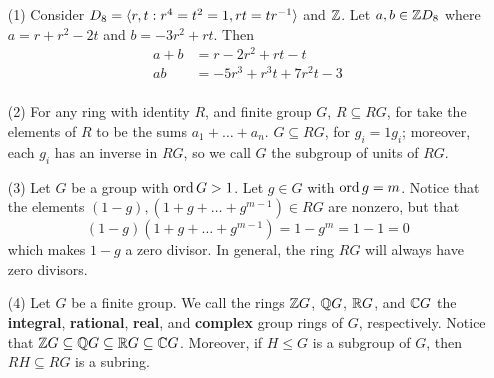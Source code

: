 \begin{example}\label{example_5.8}
    \begin{enumerate}
        \item[(1)] Consider $D_8=\langle r,t : r^4=t^2=1, rt=tr^{-1} \rangle$
            and $\mathbb{Z}$. Let $a,b \in \mathbb{Z}{D_8}$ where $a=r+r^2-2t$ and  $b=-3r^2+rt$.
            Then
            \begin{align*}
                a+b &=  r-2r^2+rt-t \\
                ab  &=  -5r^3+r^3t+7r^2t-3  \\
            \end{align*}

        \item[(2)] For any ring with identity $R$, and finite group $G$, $R
            \subseteq RG$, for take the elements of  $R$ to be the sums
            $a_1+\dots+a_n$. $G \subseteq RG$, for  $g_i=1g_i$; moreover, each
            $g_i$ has an inverse in  $RG$, so we call  $G$ the subgroup of units
            of $RG$.

        \item[(3)] Let $G$ be a group with $\operatorname{ord}{G}>1$. Let $g \in G$ with
            $\operatorname{ord}{g}=m$. Notice that the elements $(1-g),(1+g+\dots+g^{m-1}) \in
            RG$ are nonzero, but that
            \begin{equation*}
                (1-g)(1+g+\dots+g^{m-1})=1-g^m=1-1=0
            \end{equation*}
            which makes $1-g$ a zero divisor. In general, the ring $RG$ will
            always have zero divisors.

        \item[(4)] Let $G$ be a finite group. We call the rings  $\mathbb{Z}{G}$,
            $\mathbb{Q}{G}$, $\mathbb{R}{G}$, and $\mathbb{C}{G}$ the \textbf{integral},
            \textbf{rational}, \textbf{real}, and \textbf{complex} group rings
            of $G$, respectively. Notice that $\mathbb{Z}{G} \subseteq \mathbb{Q}{G} \subseteq
            \mathbb{R}{G} \subseteq \mathbb{C}{G}$. Moreover, if $H \leq G$ is a subgroup of
            $G$, then  $RH \subseteq RG$ is a subring.
    \end{enumerate}
\end{example}
